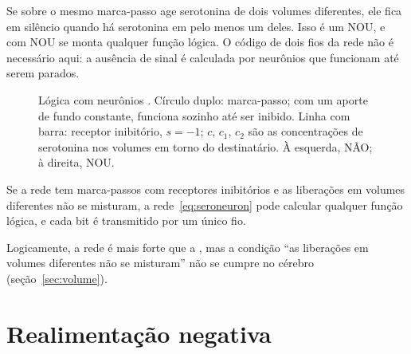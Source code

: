 Se sobre o mesmo marca-passo age serotonina de dois volumes diferentes, ele fica em silêncio quando há serotonina em pelo menos um deles. Isso é um NOU, e com NOU se monta qualquer função lógica. O código de dois fios da rede  não é necessário aqui: a ausência de sinal é calculada por neurônios que funcionam até serem parados.

\begin{figure}[t]
\centering
{}
\caption{Lógica com neurônios . Círculo duplo: marca-passo; com um aporte de fundo constante, funciona sozinho até ser inibido. Linha com barra: receptor inibitório, $s=-1$; $c$, $c_1$, $c_2$ são as concentrações de serotonina nos volumes em torno do destinatário. À esquerda, NÃO; à direita, NOU.}
\label{fig:serogates}
\end{figure}

\begin{keyblock}
\begin{proposition}
\label{prop:serocomplete}
Se a rede tem marca-passos com receptores inibitórios e as liberações em volumes diferentes não se misturam, a rede~\eqref{eq:seroneuron} pode calcular qualquer função lógica, e cada bit é transmitido por um único fio.
\end{proposition}
\end{keyblock}

Logicamente, a rede  é mais forte que a , mas a condição ``as liberações em volumes diferentes não se misturam'' não se cumpre no cérebro (seção~\ref{sec:volume}).

\section{Realimentação negativa}

